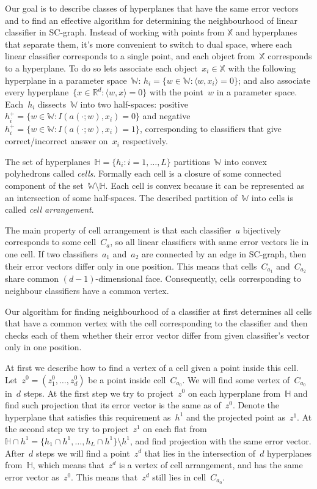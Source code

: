 \documentclass{article}
\def\RR{\mathbb{R}}
\def\XX{\mathbb{X}}
\def\WW{\mathbb{W}}
\def\HH{\mathbb{H}}
\renewcommand{\emph}[1]{\textit{#1}}
\begin{document}
Our goal is to describe classes of hyperplanes that have the same error vectors
and to find an effective algorithm for determining the neighbourhood of
linear classifier in SC-graph.
Instead of working with points from $\XX$ and hyperplanes that separate them,
it's more convenient to switch to dual space,
where each linear classifier corresponds to a single point,
and each object from~$\XX$ corresponds to a hyperplane.
To do so lets associate each object~$x_i \in \XX$ with the following hyperplane in a parameter space~$\WW$:
$h_i = \{ w \in \WW: \langle w, x_i \rangle = 0 \}$;
and also associate every hyperplane~$\{ x \in \RR^d : \langle w, x \rangle = 0 \}$
with the point~$w$ in a parameter space.
Each~$h_i$ dissects~$\WW$ into two half-spaces:
positive~$h_i^+ = \{ w \in \WW: I(a(\cdot; w), x_i) = 0 \}$
and negative~$h_i^+ = \{ w \in \WW: I(a(\cdot; w), x_i) = 1 \}$,
corresponding to classifiers that give correct/incorrect answer on~$x_i$ respectively.

The set of hyperplanes~$\HH = \{h_i : i = 1, \dots, L\}$ partitions~$\WW$
into convex polyhedrons called \emph{cells}.
Formally each cell is a closure of some connected component
of the set~$\WW \setminus \HH$.
Each cell is convex because it can be represented as an intersection
of some half-spaces.
The described partition of~$\WW$ into cells is called \emph{cell arrangement}.

The main property of cell arrangement is that each classifier~$a$ bijectively
corresponds to some cell~$C_a$,
so all linear classifiers with same error vectors lie in one cell.
If two classifiers~$a_1$ and~$a_2$ are connected by an edge in SC-graph,
then their error vectors differ only in one position.
This means that cells~$C_{a_1}$ and~$C_{a_2}$ share common $(d - 1)$-dimensional face.
Consequently, cells corresponding to neighbour classifiers have a common vertex.

Our algorithm for finding neighbourhood of a classifier
at first determines all cells that have a common vertex with
the cell corresponding to the classifier and then checks each of them
whether their error vector differ from given classifier's vector only in one position.

At first we describe how to find a vertex of a cell given a point inside this cell.
Let~$z^0 = (z_1^0, \dots, z_d^0)$ be a point inside cell~$C_{a_0}$.
We will find some vertex of~$C_{a_0}$ in~$d$ steps.
At the first step we try to project~$z^0$ on each hyperplane from~$\HH$
and find such projection that its error vector is the same as of~$z^0$.
Denote the hyperplane that satisfies this requirement as~$h^1$
and the projected point as~$z^1$.
At the second step we try to project~$z^1$ on each flat
from~$\HH \cap h^1 = \{ h_1 \cap h^1, \dots, h_L \cap h^1 \} \setminus h^1$,
and find projection with the same error vector.
After~$d$ steps we will find a point~$z^d$ that lies in the intersection of~$d$
hyperplanes from~$\HH$, which means that~$z^d$ is a vertex of cell arrangement,
and has the same error vector as~$z^0$. This means
that~$z^d$ still lies in cell~$C_{a_0}$.
\end{document}
